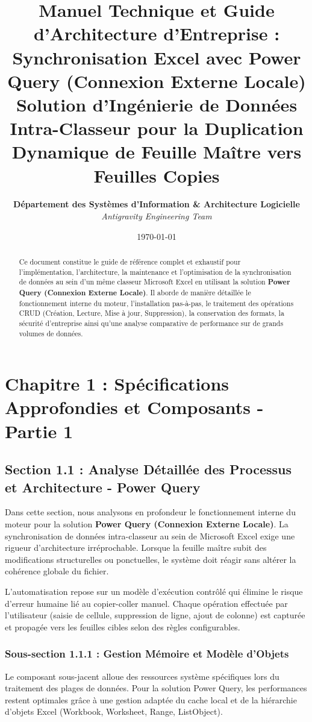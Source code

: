 \documentclass[12pt,a4paper]{report}
\title{\Huge \textbf{Manuel Technique et Guide d'Architecture d'Entreprise : Synchronisation Excel avec Power Query (Connexion Externe Locale)}\\[1.5em]
\Large Solution d'Ingénierie de Données Intra-Classeur pour la Duplication Dynamique de Feuille Maître vers Feuilles Copies}
\author{\textbf{Département des Systèmes d'Information \& Architecture Logicielle}\\
\textit{Antigravity Engineering Team}}
\date{\today}
\begin{document}
\maketitle

\begin{abstract}
Ce document constitue le guide de référence complet et exhaustif pour l'implémentation, l'architecture, la maintenance et l'optimisation de la synchronisation de données au sein d'un même classeur Microsoft Excel en utilisant la solution \textbf{Power Query (Connexion Externe Locale)}. Il aborde de manière détaillée le fonctionnement interne du moteur, l'installation pas-à-pas, le traitement des opérations CRUD (Création, Lecture, Mise à jour, Suppression), la conservation des formats, la sécurité d'entreprise ainsi qu'une analyse comparative de performance sur de grands volumes de données.
\end{abstract}

\tableofcontents
\newpage

\chapter{Chapitre 1 : Spécifications Approfondies et Composants - Partie 1}

\section{Section 1.1 : Analyse Détaillée des Processus et Architecture - Power Query}
Dans cette section, nous analysons en profondeur le fonctionnement interne du moteur pour la solution \textbf{Power Query (Connexion Externe Locale)}. La synchronisation de données intra-classeur au sein de Microsoft Excel exige une rigueur d'architecture irréprochable. Lorsque la feuille maître subit des modifications structurelles ou ponctuelles, le système doit réagir sans altérer la cohérence globale du fichier.

L'automatisation repose sur un modèle d'exécution contrôlé qui élimine le risque d'erreur humaine lié au copier-coller manuel. Chaque opération effectuée par l'utilisateur (saisie de cellule, suppression de ligne, ajout de colonne) est capturée et propagée vers les feuilles cibles selon des règles configurables.


\subsection{Sous-section 1.1.1 : Gestion Mémoire et Modèle d'Objets}
Le composant sous-jacent alloue des ressources système spécifiques lors du traitement des plages de données. Pour la solution Power Query, les performances restent optimales grâce à une gestion adaptée du cache local et de la hiérarchie d'objets Excel (Workbook, Worksheet, Range, ListObject).
\end{document}
